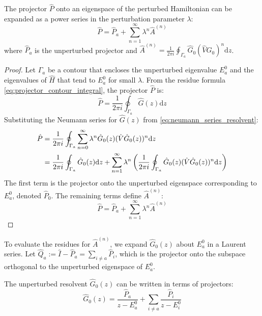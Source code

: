 \begin{proposition}
  The projector $\hat P$ onto an eigenspace of the perturbed
  Hamiltonian can be expanded as a power series in the perturbation
  parameter $\lambda$:
  \begin{equation} \label{eq:projector_expansion}
    \hat P = \hat P_a+\sum_{n=1}^{\infty}\lambda^n \hat A^{(n)}
  \end{equation}
  where $\hat P_a$ is the unperturbed projector and $\hat
  A^{(n)}=\frac{1}{2\pi i}\oint_{\Gamma_a} \hat G_0(\hat V \hat
  G_0)^n \mathrm dz$.
\end{proposition}
\begin{proof}
  Let $\Gamma_a$ be a contour that encloses the unperturbed
  eigenvalue $E_a^0$ and the eigenvalues of $\hat H$ that tend to
  $E_a^0$ for small $\lambda$. From the residue formula
  \eqref{eq:projector_contour_integral}, the projector $\hat P$ is:
  \begin{equation}
    \hat P=\frac{1}{2\pi i}\oint_{\Gamma_a} \hat G(z)\mathrm d z
  \end{equation}
  Substituting the Neumann series for $\hat G(z)$ from
  \eqref{eq:neumann_series_resolvent}:
  \begin{align} \label{eq:projector_expansion_derivation}
    \hat P &= \frac{1}{2 \pi i} \oint_{\Gamma_a}
    \sum_{n=0}^\infty \lambda^n \hat G_0(z) (\hat V \hat
    G_0(z))^n \mathrm d z \\
    &= \frac{1}{2 \pi i} \oint_{\Gamma_a} \hat G_0(z) \mathrm d z
    + \sum_{n=1}^\infty \lambda^n \left(\frac{1}{2 \pi i}
      \oint_{\Gamma_a} \hat G_0(z) (\hat V \hat G_0(z))^n \mathrm d
    z\right) \notag
  \end{align}
  The first term is the projector onto the unperturbed eigenspace
  corresponding to $E_a^0$, denoted $\hat P_0$.
  The remaining terms define $\hat A^{(n)}$:
  \begin{equation}
    \hat P = \hat P_a+\sum_{n=1}^{\infty}\lambda^n \hat A^{(n)}
  \end{equation}
\end{proof}

To evaluate the residues for $\hat A^{(n)}$, we expand $\hat G_0(z)$
about $E_a^0$ in a Laurent series.
Let $\hat Q_a := \hat I-\hat P_a = \sum_{i \ne a} \hat P_i$, which is
the projector onto the subspace orthogonal to the unperturbed
eigenspace of $E_a^0$.
\begin{definition}
  The unperturbed resolvent $\hat G_0(z)$ can be written in terms
  of projectors:
  \begin{equation} \label{eq:G0_projector_sum}
    \hat G_0(z)=\frac{\hat P_a}{z-E_a^0}+\sum_{i\neq a}\frac{\hat
    P_i}{z-E_i^0}
  \end{equation}
\end{definition}


